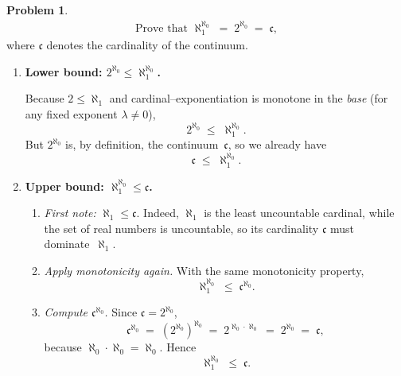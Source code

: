 \documentclass[12pt]{article}
\theoremstyle{definition} %
\newtheorem{problem}{Problem}
\theoremstyle{plain} %
\begin{document}
\begin{problem}
    \begin{align}
        \text{Prove that } \aleph_{1}^{\aleph_{0}} \;=\; 2^{\aleph_{0}}
        \;=\; \mathfrak c,
    \end{align}
    where $\mathfrak c$ denotes the cardinality of the continuum.
\end{problem}

\begin{enumerate}
\item \textbf{Lower bound: $\displaystyle 2^{\aleph_{0}}\le
        \aleph_{1}^{\aleph_{0}}$.}

      Because $2\le\aleph_{1}$ and cardinal–exponentiation is monotone in
      the \emph{base} (for any fixed exponent $\lambda\neq0$),
      \[
          2^{\aleph_{0}}
          \;\le\;
          \aleph_{1}^{\aleph_{0}}.
      \]
      But $2^{\aleph_{0}}$ is, by definition, the continuum~$\mathfrak c$,
      so we already have
      \[
          \mathfrak c\;\le\;\aleph_{1}^{\aleph_{0}}.
      \]

\item \textbf{Upper bound: $\displaystyle \aleph_{1}^{\aleph_{0}}\le
        \mathfrak c$.}

      \begin{enumerate}
          \item \emph{First note:}  
                $\aleph_{1}\le \mathfrak c$.  
                Indeed, $\aleph_{1}$ is the least uncountable
                cardinal, while the set of real numbers is uncountable, so
                its cardinality $\mathfrak c$ must dominate~$\aleph_{1}$.

          \item \emph{Apply monotonicity again.}  
                With the same monotonicity property,
                \[
                    \aleph_{1}^{\aleph_{0}}
                    \;\le\;
                    \mathfrak c^{\aleph_{0}}.
                \]

          \item \emph{Compute $\mathfrak c^{\aleph_{0}}$.}  
                Since $\mathfrak c = 2^{\aleph_{0}}$,
                \[
                    \mathfrak c^{\aleph_{0}}
                    \;=\;
                    (2^{\aleph_{0}})^{\aleph_{0}}
                    \;=\;
                    2^{\aleph_{0}\cdot\aleph_{0}}
                    \;=\;
                    2^{\aleph_{0}}
                    \;=\;
                    \mathfrak c,
                \]
                because $\aleph_{0}\cdot\aleph_{0}=\aleph_{0}$.
                Hence
                \[
                    \aleph_{1}^{\aleph_{0}}
                    \;\le\;
                    \mathfrak c.
                \]
      \end{enumerate}


\end{enumerate}
\end{document}
